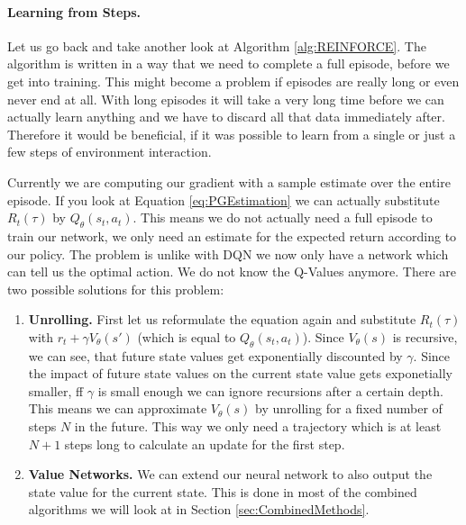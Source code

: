 \paragraph{Learning from Steps.}
Let us go back and take another look at Algorithm \ref{alg:REINFORCE}. The algorithm is written in a way that we need to complete a full episode, before we get into training. This might become a problem if episodes are really long or even never end at all. With long episodes it will take a very long time before we can actually learn anything and we have to discard all that data immediately after. Therefore it would be beneficial, if it was possible to learn from a single or just a few steps of environment interaction. 

Currently we are computing our gradient with a sample estimate over the entire episode. If you look at Equation \ref{eq:PGEstimation} we can actually substitute $R_t(\tau)$ by $Q_\theta(s_t, a_t)$. This means we do not actually need a full episode to train our network, we only need an estimate for the expected return according to our policy. The problem is unlike with DQN we now only have a network which can tell us the optimal action. We do not know the Q-Values anymore. There are two possible solutions for this problem:

\begin{enumerate}
  \item \textbf{Unrolling.} First let us reformulate the equation again and substitute $R_t(\tau)$ with $r_t + \gamma V_\theta(s')$ (which is equal to $Q_\theta(s_t, a_t)$). Since $V_\theta(s)$ is recursive, we can see, that future state values get exponentially discounted by $\gamma$. Since the impact of future state values on the current state value gets exponetially smaller, ff $\gamma$ is small enough we can ignore recursions after a certain depth. This means we can approximate $V_\theta(s)$ by unrolling for a fixed number of steps $N$ in the future. This way we only need a trajectory which is at least $N+1$ steps long to calculate an update for the first step. 
  \item \textbf{Value Networks.} We can extend our neural network to also output the state value for the current state. This is done in most of the combined algorithms we will look at in Section \ref{sec:CombinedMethods}.  
\end{enumerate}

